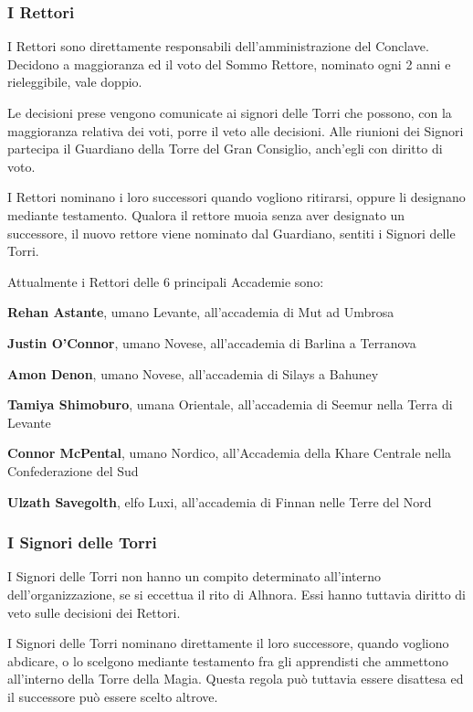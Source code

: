 \subsubsection{I Rettori}

I Rettori sono direttamente responsabili dell'amministrazione del
Conclave.  Decidono a maggioranza ed il voto del Sommo Rettore,
nominato ogni 2 anni e rieleggibile, vale doppio.

Le decisioni prese vengono comunicate ai signori delle Torri che
possono, con la maggioranza relativa dei voti, porre il veto alle
decisioni.  Alle riunioni dei Signori partecipa il Guardiano della
Torre del Gran Consiglio, anch'egli con diritto di voto.

I Rettori nominano i loro successori quando vogliono ritirarsi, oppure
li designano mediante testamento. Qualora il rettore muoia senza aver
designato un successore, il nuovo rettore viene nominato dal
Guardiano, sentiti i Signori delle Torri.

Attualmente i Rettori delle 6 principali Accademie sono: 

\begin{description}
\item{\bf Rehan Astante}, umano Levante, all'accademia di Mut ad
  Umbrosa
\item{\bf Justin O'Connor}, umano Novese, all'accademia di Barlina a
  Terranova
\item{\bf Amon Denon}, umano Novese, all'accademia di Silays a Bahuney
\item{\bf Tamiya Shimoburo}, umana Orientale, all'accademia di Seemur
  nella Terra di Levante
\item{\bf Connor McPental}, umano Nordico, all'Accademia della Khare
  Centrale nella Confederazione del Sud
\item{\bf Ulzath Savegolth}, elfo Luxi, all'accademia di Finnan nelle
  Terre del Nord
\end{description}


\subsubsection{I Signori delle Torri}

I Signori delle Torri non hanno un compito determinato all'interno
dell'organizzazione, se si eccettua il rito di Alhnora.  Essi hanno
tuttavia diritto di veto sulle decisioni dei Rettori.

I Signori delle Torri nominano direttamente il loro successore, quando
vogliono abdicare, o lo scelgono mediante testamento fra gli
apprendisti che ammettono all'interno della Torre della Magia. Questa
regola pu\`o tuttavia essere disattesa ed il successore pu\`o essere scelto
altrove.

